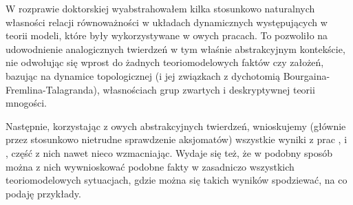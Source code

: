 \documentclass[12pt,a4paper]{article}
\begin{document}
	W rozprawie doktorskiej wyabstrahowałem kilka stosunkowo naturalnych własności relacji równoważności w układach dynamicznych występujących w teorii modeli, które były wykorzystywane w owych pracach. To pozwoliło na udowodnienie analogicznych twierdzeń w tym właśnie abstrakcyjnym kontekście, nie odwołując się wprost do żadnych teoriomodelowych faktów czy założeń, bazując na dynamice topologicznej (i jej związkach z dychotomią Bourgaina-Fremlina-Talagranda), własnościach grup zwartych i deskryptywnej teorii mnogości.
	
	Następnie, korzystając z owych abstrakcyjnych twierdzeń, wnioskujemy (głównie przez stosunkowo nietrudne sprawdzenie aksjomatów) wszystkie wyniki z prac \cite{KPR15}, \cite{Rz16} i \cite{KR18}, część z nich nawet nieco wzmacniając. Wydaje się też, że w podobny sposób można z nich wywnioskować podobne fakty w zasadniczo wszystkich teoriomodelowych sytuacjach, gdzie można się takich wyników spodziewać, na co podaję przykłady.
	
\end{document}

